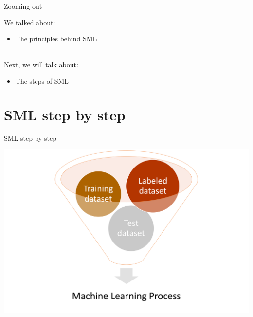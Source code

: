 \documentclass[handout]{beamer}
\begin{document}
	
	
	\begin{frame}{Zooming out} 
		
		We talked about:
		\begin{itemize}
			\item The principles behind SML \\\
		\end{itemize}
		
		Next, we will talk about:
		\begin{itemize}
			\item The steps of SML
		\end{itemize}
		
	\end{frame}
	
	
	\section{SML step by step}
	
	\begin{frame}{SML step by step}
		
		\begin{center}
			\includegraphics[width=\linewidth,height=\textheight,keepaspectratio]{../pictures/MLingredients.png} \\\
		\end{center}
		
		
		
	\end{frame}
	
\end{document}
